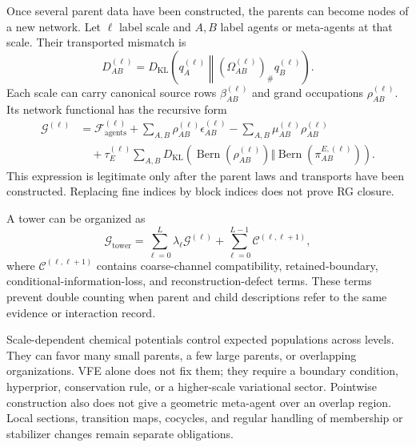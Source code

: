 \documentclass[11pt,letterpaper]{article}
\newcommand{\KL}{D_{\mathrm{KL}}}
\newcommand{\cF}{\mathcal F}
\newcommand{\cG}{\mathcal G}
\newcommand{\cC}{\mathcal C}
\newcommand{\push}{_{\#}}
\newcommand{\Bern}{\operatorname{Bern}}
\begin{document}
Once several parent data have been constructed, the parents can become nodes of a new network.  Let $\ell$ label scale and $A,B$ label agents or meta-agents at that scale.  Their transported mismatch is
\begin{equation}
 D_{AB}^{(\ell)}
 =\KL\left(q_A^{(\ell)}\middle\Vert
 (\Omega_{AB}^{(\ell)})\push q_B^{(\ell)}\right).
 \label{eq:scale-divergence}
\end{equation}
Each scale can carry canonical source rows $\beta_{AB}^{(\ell)}$ and grand occupations $\rho_{AB}^{(\ell)}$.  Its network functional has the recursive form
\begin{align}
 \cG^{(\ell)}
 &=\cF_{\mathrm{agents}}^{(\ell)}
 +\sum_{A,B}\rho_{AB}^{(\ell)}\epsilon_{AB}^{(\ell)}
 -\sum_{A,B}\mu_{AB}^{(\ell)}\rho_{AB}^{(\ell)}
 \nonumber\\
 &\quad+\tau_E^{(\ell)}\sum_{A,B}
 \KL\left(\Bern(\rho_{AB}^{(\ell)})
 \Vert\Bern(\pi_{AB}^{E,(\ell)})\right).
 \label{eq:scale-grand-potential}
\end{align}
This expression is legitimate only after the parent laws and transports have been constructed.  Replacing fine indices by block indices does not prove RG closure.

A tower can be organized as
\begin{equation}
 \cG_{\mathrm{tower}}
 =\sum_{\ell=0}^{L}\lambda_{\ell}\cG^{(\ell)}
 +\sum_{\ell=0}^{L-1}\cC^{(\ell,\ell+1)},
 \label{eq:tower-grand-potential}
\end{equation}
where $\cC^{(\ell,\ell+1)}$ contains coarse-channel compatibility, retained-boundary, conditional-information-loss, and reconstruction-defect terms.  These terms prevent double counting when parent and child descriptions refer to the same evidence or interaction record.

Scale-dependent chemical potentials control expected populations across levels.  They can favor many small parents, a few large parents, or overlapping organizations.  VFE alone does not fix them; they require a boundary condition, hyperprior, conservation rule, or a higher-scale variational sector.  Pointwise construction also does not give a geometric meta-agent over an overlap region.  Local sections, transition maps, cocycles, and regular handling of membership or stabilizer changes remain separate obligations.
\end{document}
